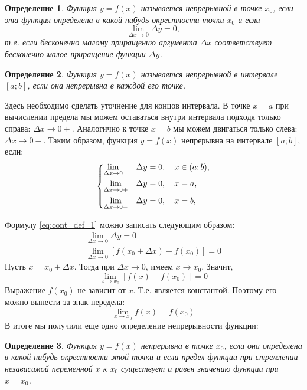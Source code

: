\documentclass[a4paper, 12pt, final]{article}
\newtheorem{definition}{Определение}
\begin{document}
\begin{definition}
    Функция $y=f(x)$ называется непрерывной в точке $x_0$, если эта функция определена в какой-нибудь окрестности точки $x_0$ и если
    \begin{equation}
        \lim_{\Delta x \to 0} \Delta y = 0,
        \label{eq:cont_def_1}
    \end{equation}
    т.е. если бесконечно малому приращению аргумента $\Delta x$ соответствует бесконечно малое приращение функции $\Delta y$.
    \label{def:cont_def_1}
\end{definition}

\begin{definition}
    Функция $y=f(x)$ называется непрерывной в интервале $[a;b]$, если она непрерывна в каждой его точке.
    \label{def:cont_def_interval}
\end{definition}
Здесь необходимо сделать уточнение для концов интервала.
В точке $x=a$ при вычислении предела мы можем оставаться внутри интервала подходя только справа: $\Delta x \to 0+$.
Аналогично к точке $x=b$ мы можем двигаться только слева: $\Delta x \to 0-$.
Таким образом, функция $y=f(x)$ непрерывна на интервале $[a;b]$, если:
\begin{equation}
    \begin{dcases}
        \lim_{\Delta x \to 0 } &\Delta y = 0, \quad x \in (a;b),\\
        \lim_{\Delta x \to 0+} &\Delta y = 0, \quad x = a,      \\
        \lim_{\Delta x \to 0-} &\Delta y = 0, \quad x = b,
    \end{dcases}
    \label{eq:cont_def_inerval_1}
\end{equation}

Формулу \eqref{eq:cont_def_1} можно записать следующим образом:
\begin{align*}
    \lim_{\Delta x \to 0} \Delta y = 0 \\
    \lim_{\Delta x \to 0} \left[ f(x_0 + \Delta x) - f(x_0) \right] = 0
\end{align*}
Пусть $x=x_0 + \Delta x$.
Тогда при $\Delta x \to 0$, имеем $x \to x_0$.
Значит,
\begin{equation*}
    \lim_{x \to x_0} \left[ f(x) - f(x_0) \right] = 0
\end{equation*}
Выражение $f(x_0)$ не зависит от $x$.
Т.е. является константой.
Поэтому его можно вынести за знак передела:
\begin{equation}
    \lim_{x \to x_0} f(x) = f(x_0)
    \label{eq:cont_def_2}
\end{equation}
В итоге мы получили еще одно определение непрерывности функции:
\begin{definition}
    Функция $y=f(x)$ непрерывна в точке $x_0$, если она определена в какой-нибудь окрестности этой точки и если предел функции при стремлении независимой переменной $x$ к $x_0$ существует и равен значению функции при $x=x_0$.
    \label{def:conf_def_2}
\end{definition}
\end{document}
